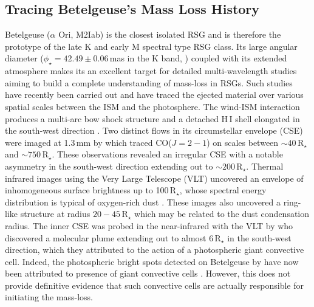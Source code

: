 \documentclass[iop]{emulateapj}
\begin{document}
\subsection{Tracing Betelgeuse's Mass Loss History}
Betelgeuse ($\alpha$ Ori, M2Iab) is the closest isolated RSG \citep[$d=197 \pm 45$\,pc;][]{harper_2008} and is therefore the prototype of the late K and early M spectral type RSG class. Its large angular diameter ($\phi _{\star} = 42.49 \pm 0.06\,$mas in the K band, \citealt{ohnaka_2011}) coupled with its extended atmosphere makes its an excellent target for detailed multi-wavelength studies aiming to build a complete understanding of mass-loss in RSGs. Such studies have recently been carried out and have traced the ejected material over various spatial scales between the ISM and the photosphere. The wind-ISM interaction produces a multi-arc bow shock structure \citep{decin_2012} and a detached H\,I shell elongated in the south-west direction \citep{le_bertre_2012}. Two distinct flows in its circumstellar envelope (CSE) were imaged at 1.3\,mm by \cite{ogorman_2012} which traced CO($J=2-1$) on scales between $\sim 40$\,R$_{\star}$ and $\sim 750$\,R$_{\star}$. These observations revealed an irregular CSE with a notable asymmetry in the south-west direction extending out to $\sim 200$\,R$_{\star}$. Thermal infrared images using the Very Large Telescope (VLT)  uncovered an envelope of inhomogeneous surface brightness up to 100\,R$_{\star}$, whose spectral energy distribution is typical of oxygen-rich dust \citep{kervella_2011}. These images also uncovered a ring-like structure at radius $20-45$\,R$_{\star}$ which may be related to the dust condensation radius. The inner CSE  was probed in the near-infrared with the VLT by \cite{kervella_2009} who discovered a molecular plume extending out to almost 6\,R$_{\star}$ in the south-west direction, which they attributed to the action of a photospheric giant convective cell. Indeed, the photospheric bright spots detected on Betelgeuse by \cite{Haubois_2009} have now been attributed to presence of giant convective cells \citep{chiavassa_2010}. However, this does not provide definitive evidence that such convective cells are actually responsible for initiating the mass-loss.
\end{document}
